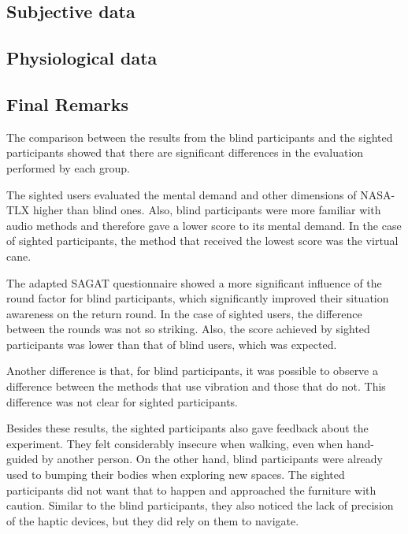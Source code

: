 %
\subsection{Subjective data}




\subsection{Physiological data}




\subsection{Final Remarks}

The comparison between the results from the blind participants and the sighted participants showed that there are significant differences in the evaluation performed by each group.

The sighted users evaluated the mental demand and other dimensions of NASA-TLX higher than blind ones. Also, blind participants were more familiar with audio methods and therefore gave a lower score to its mental demand. In the case of sighted participants, the method that received the lowest score was the virtual cane. 

The adapted SAGAT questionnaire showed a more significant influence of the round factor for blind participants, which significantly improved their situation awareness on the return round. In the case of sighted users, the difference between the rounds was not so striking. Also, the score achieved by sighted participants was lower than that of blind users, which was expected.

Another difference is that, for blind participants, it was possible to observe a difference between the methods that use vibration and those that do not. This difference was not clear for sighted participants. 

Besides these results, the sighted participants also gave feedback about the experiment. They felt considerably insecure when walking, even when hand-guided by another person. On the other hand, blind participants were already used to bumping their bodies when exploring new spaces. The sighted participants did not want that to happen and approached the furniture with caution. Similar to the blind participants, they also noticed the lack of precision of the haptic devices, but they did rely on them to navigate.